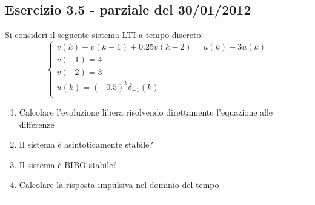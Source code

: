 \documentclass[12pt,a4paper]{article}
\begin{document}
	\subsection*{Esercizio 3.5 - parziale del 30/01/2012} Si consideri il seguente sistema LTI a tempo discreto:
	\[
		\begin{cases}
			v(k) - v(k-1) + 0.25v(k-2) = u(k) - 3u(k)\\
			v(-1) = 4\\
			v(-2) = 3\\
			u(k) = (-0.5)^k\delta_{-1}(k)\\
		\end{cases}
	\]
	\begin{enumerate}
		\item Calcolare l'evoluzione libera risolvendo direttamente l'equazione alle differenze
		\item Il sistema \`e asintoticamente stabile?
		\item Il sistema \`e BIBO stabile?
		\item Calcolare la risposta impulsiva nel dominio del tempo
	\end{enumerate}
	\par\noindent\rule{\textwidth}{0.4pt}
\end{document}
